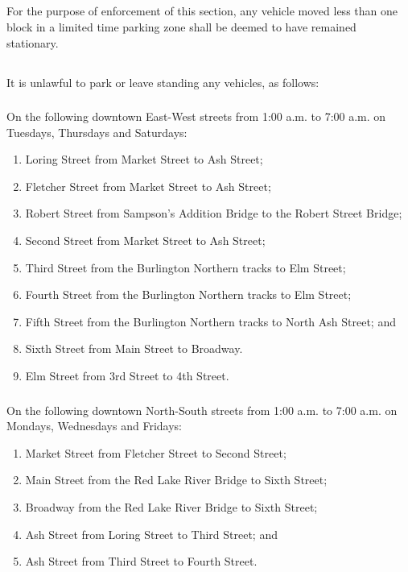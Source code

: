 \subsection{}
For the purpose of enforcement of this section, any vehicle moved less than one block in a limited time parking zone shall be deemed to have remained stationary.
\subsection{}
It is unlawful to park or leave standing any vehicles, as follows:
\subsubsection{}
On the following downtown East-West streets from 1:00 a.m. to 7:00 a.m. on Tuesdays, Thursdays and Saturdays:
\begin{enumerate}[{\indent}a)]
\item Loring Street from Market Street to Ash Street;
\item Fletcher Street from Market Street to Ash Street;
\item Robert Street from Sampson’s Addition Bridge to the Robert Street Bridge;
\item Second Street from Market Street to Ash Street;
\item Third Street from the Burlington Northern tracks to Elm Street;
\item Fourth Street from the Burlington Northern tracks to Elm Street;
\item Fifth Street from the Burlington Northern tracks to North Ash Street; and
\item Sixth Street from Main Street to Broadway.
\item Elm Street from 3rd Street to 4th Street.
\end{enumerate}
\subsubsection{}
On the following downtown North-South streets from 1:00 a.m. to 7:00 a.m. on Mondays, Wednesdays and Fridays:
\begin{enumerate}[{\indent}a)]
\item Market Street from Fletcher Street to Second Street;
\item Main Street from the Red Lake River Bridge to Sixth Street;
\item Broadway from the Red Lake River Bridge to Sixth Street;
\item Ash Street from Loring Street to Third Street; and
\item Ash Street from Third Street to Fourth Street.
\end{enumerate}

